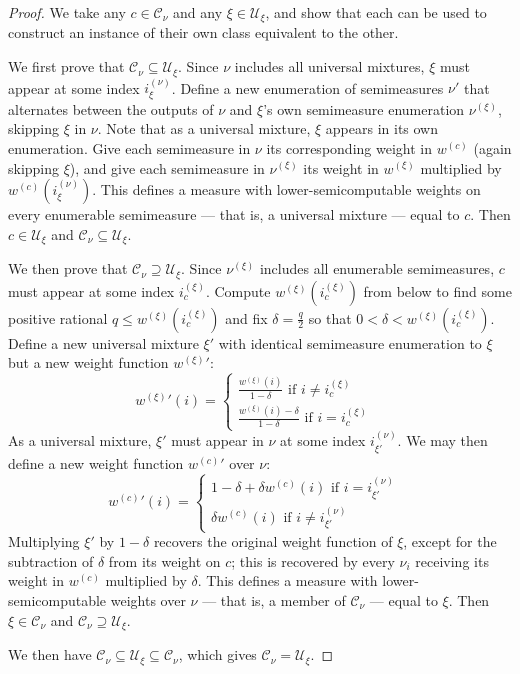\documentclass[10pt,a4paper]{amsart}
\begin{document}
\begin{proof}
We take any $c\in\mathcal{C}_\nu$ and any $\xi\in\mathcal{U}_\xi$, and show that each can be used to construct an instance of their own class equivalent to the other.

We first prove that $\mathcal{C}_\nu\subseteq\mathcal{U}_\xi$.
Since $\nu$ includes all universal mixtures, $\xi$ must appear at some index $i_\xi^{(\nu)}$. Define a new enumeration of semimeasures $\nu'$ that alternates between the outputs of $\nu$ and $\xi$'s own semimeasure enumeration $\nu^{(\xi)}$, skipping $\xi$ in $\nu$. Note that as a universal mixture, $\xi$ appears in its own enumeration.
Give each semimeasure in $\nu$ its corresponding weight in $w^{(c)}$ (again skipping $\xi$), and give each semimeasure in $\nu^{(\xi)}$ its weight in $w^{(\xi)}$ multiplied by $w^{(c)}(i_\xi^{(\nu)})$.
This defines a measure with lower-semicomputable weights on every enumerable semimeasure --- that is, a universal mixture --- equal to $c$. Then $c\in\mathcal{U}_\xi$ and $\mathcal{C}_\nu\subseteq\mathcal{U}_\xi$.

We then prove that $\mathcal{C}_\nu\supseteq\mathcal{U}_\xi$.
Since $\nu^{(\xi)}$ includes all enumerable semimeasures, $c$ must appear at some index $i_c^{(\xi)}$.
Compute $w^{(\xi)}(i_c^{(\xi)})$ from below to find some positive rational $q\leq w^{(\xi)}(i_c^{(\xi)})$ and fix $\delta = \frac{q}{2}$ so that $0<\delta<w^{(\xi)}(i_c^{(\xi)})$.
Define a new universal mixture $\xi'$ with identical semimeasure enumeration to $\xi$ but a new weight function ${w^{(\xi)}}'$:
\[{w^{(\xi)}}'(i) = \begin{cases} \frac{w^{(\xi)}(i)}{1-\delta} \text{ if } i \neq i_c^{(\xi)} & \\ \frac{w^{(\xi)}(i)-\delta}{1-\delta} \text{ if } i = i_c^{(\xi)} \end{cases}\]
As a universal mixture, $\xi'$ must appear in $\nu$ at some index $i_{\xi'}^{(\nu)}$.
We may then define a new weight function ${w^{(c)}}'$ over $\nu$:
\[{w^{(c)}}'(i) = \begin{cases} 1-\delta + \delta w^{(c)}(i) \text{ if } i = i_{\xi'}^{(\nu)} & \\ \delta w^{(c)}(i) \text{ if } i \neq i_{\xi'}^{(\nu)} \end{cases}\]
Multiplying $\xi'$ by $1-\delta$ recovers the original weight function of $\xi$, except for the subtraction of $\delta$ from its weight on $c$; this is recovered by every $\nu_i$ receiving its weight in $w^{(c)}$ multiplied by $\delta$.
This defines a measure with lower-semicomputable weights over $\nu$ --- that is, a member of $\mathcal{C}_\nu$ --- equal to $\xi$. Then $\xi\in\mathcal{C}_\nu$ and $\mathcal{C}_\nu\supseteq\mathcal{U}_\xi$.

We then have $\mathcal{C}_\nu\subseteq\mathcal{U}_\xi\subseteq\mathcal{C}_\nu$, which gives $\mathcal{C}_\nu=\mathcal{U}_\xi$.
\end{proof}
\end{document}

